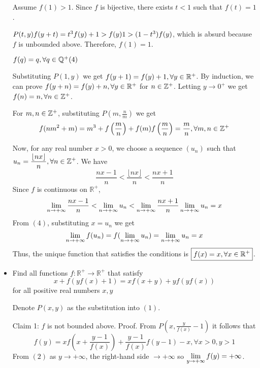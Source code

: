 \documentclass[11pt]{scrartcl}
\begin{document}
\begin{itemize}[label=, leftmargin=0em, itemsep=0.2em]
\begin{sol}
\begin{pro}
            Assume $f(1) > 1$. Since $f$ is bijective, there exists $t < 1$ such that $f(t) = 1$. 
            
            $P(t,y) \ra f(y + t) = t^3f(y) + 1 > f(y) \lra 1 > (1 - t^3)f(y)$, which is absurd because $f$ is unbounded above. Therefore, $f(1) = 1$.
        \end{pro}
         $f(q) = q, \forall q \in \mathbb{Q^+} (4)$ 
        \begin{pro}
            Substituting $P(1,y)$ we get $f(y + 1) = f(y) + 1, \forall y\in \mathbb{R^+}$. By induction, we can prove $f(y + n) = f(y) + n, \forall y\in \mathbb{R^+}$ for $n \in \mathbb{Z^+}$. Letting $y \to 0^+$ we get $f(n) = n,\forall n \in \mathbb{Z^+}$.

            For $m,n \in \mathbb{Z^+}$, substituting $P\left(m,\frac{n}{m}\right)$ we get 
            \[
                    f(nm^2 + m) = m^3 + f\left(\frac{m}{n}\right) + f(m) \lra f\left(\frac{m}{n}\right) = \frac{m}{n}, \forall m,n \in \bb{Z^+}
            \]
        \end{pro}
        Now, for any real number $x > 0$, we choose a sequence $(u_n)$ such that $u_n = \frac{\lfloor nx \rfloor}{n}, \forall n \in \bb{Z^+}$. We have 
        \[
            \frac{nx - 1}{n} <  \frac{\lfloor nx \rfloor}{n} < \frac{nx + 1}{n} 
        \]
        Since $f$ is continuous on $\mathbb{R^+}$,
        \[
           \dlim \frac{nx - 1}{n} <\dlim u_n < \dlim\frac{nx + 1}{n} \ra \dlim u_n = x
        \]
        From $(4)$, substituting $x = u_n$ we get 
        \[
            \displaystyle\lim_{n \to +\infty} f(u_n) = f(\displaystyle\lim_{n \to +\infty} u_n) = \displaystyle\lim_{n \to +\infty} u_n = x 
        \]
        Thus, the unique function that satisfies the conditions is $\boxed{f(x) = x, \forall x\in \mathbb{R^+}}$.

    \end{sol}
    \item \begin{bt}
        Find all functions $f: \mathbb{R^+} \to \mathbb{R^+}$ that satisfy
        \[
        x+f(y f(x)+1)=x f(x+y)+y f(y f(x))\tag{1}
        \]
        for all positive real numbers $x,y$
    \end{bt}
    \begin{sol}
        Denote $P(x,y)$ as the substitution into $(1)$.

        Claim 1: $f$ is not bounded above.
Proof.
From $P\left(x,\frac{y}{f(x)} - 1\right)$ it follows that\[f(y) = xf\left(x + \frac{y-1}{f(x)}\right) + \frac{y - 1}{f(x)}f(y - 1) - x,\forall x > 0, y > 1 \tag{2}
    \]From $(2)$ as $y \to +\infty$, the right-hand side $\to +\infty$ so $\displaystyle \displaystyle\lim_{y \to +\infty} f(y) = +\infty$.


\end{sol}
\end{itemize}
\end{document}
